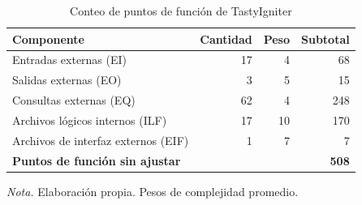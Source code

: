 \begin{table}[H]
\caption{Conteo de puntos de función de TastyIgniter}
\label{tab:ref1_pf}
\begin{threeparttable}
\begin{tabular}{>{\raggedright\arraybackslash}p{6cm} rrr}
\toprule
Componente & Cantidad & Peso & Subtotal \\
\midrule
Entradas externas (EI) & 17 & 4 & 68 \\
Salidas externas (EO) & 3 & 5 & 15 \\
Consultas externas (EQ) & 62 & 4 & 248 \\
Archivos lógicos internos (ILF) & 17 & 10 & 170 \\
Archivos de interfaz externos (EIF) & 1 & 7 & 7 \\
\textbf{Puntos de función sin ajustar} &  &  & \textbf{508} \\
\bottomrule
\end{tabular}
\begin{tablenotes}
\item \textit{Nota.} Elaboración propia. Pesos de complejidad promedio.
\end{tablenotes}
\end{threeparttable}
\end{table}

